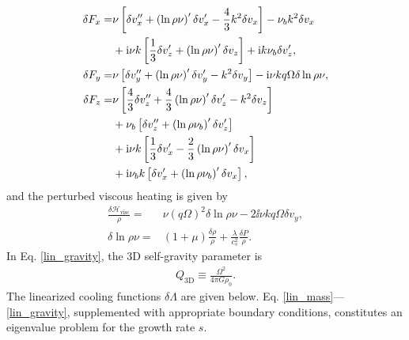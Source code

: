 \begin{align}
  \delta F_x =& \nu \left[\delta v_x^{\prime\prime} + 
    \left(\ln{\rho\nu}\right)^\prime \delta v_x^\prime - 
     \frac{4}{3}k^2\delta v_x \right] - \nu_bk^2\delta v_x \notag\\
   &+ \mathrm{i} \nu k \left[\frac{1}{3}\delta v_z^\prime+ 
    \left(\ln{\rho\nu}\right)^\prime\delta v_z\right] + \mathrm{i} k \nu_b
  \delta v_z^\prime,\\
  \delta F_y = & \nu  \left[\delta v_y^{\prime\prime} + 
    \left(\ln{\rho\nu}\right)^\prime \delta v_y^\prime - 
     k^2\delta v_y \right] - \mathrm{i}\nu kq\Omega\delta\ln{\rho\nu},\\
  \delta F_z =& \nu\left[\frac{4}{3}\delta v_z^{\prime\prime} + 
    \frac{4}{3}\left(\ln{\rho\nu}\right)^\prime \delta v_z^\prime - 
    k^2\delta v_z \right] \notag\\
  & +\nu_b\left[\delta v_z^{\prime\prime} + \left(\ln{\rho\nu_b}\right)^\prime\delta v_z^\prime\right]\notag\\
  & + \mathrm{i} \nu k  \left[\frac{1}{3}\delta v_x^\prime -  
    \frac{2}{3}\left(\ln{\rho\nu}\right)^\prime\delta v_x\right]\notag\\
  &+\mathrm{i} \nu_b k \left[\delta v_x^\prime + \left(\ln{\rho\nu_b}\right)^\prime\delta v_x\right],
\end{align}
and the perturbed viscous heating is given by 
\begin{align}
  \frac{\delta\mathcal{H}_\mathrm{visc}}{\rho}=& \nu (q\Omega)^2
  \delta\ln{\rho\nu} - 2\ii\nu k q \Omega \delta v_y,\\
  \delta\ln{\rho\nu} =& (1+\mu)\frac{\delta\rho}{\rho} +
  \frac{\lambda}{c_s^2}\frac{\delta P}{\rho}. \label{linear_beta_cool}
\end{align}
In Eq. \ref{lin_gravity}, the 3D self-gravity parameter is
\begin{align}\label{Q3d_def}
  Q_\mathrm{3D} \equiv \frac{\Omega^2}{4\pi G \rho_0}. 
\end{align}
The linearized cooling functions $\delta\Lambda$ are given below. 
Eq. \ref{lin_mass}---\ref{lin_gravity}, supplemented with appropriate
boundary conditions, constitutes an eigenvalue problem for the growth
rate $s$. 

